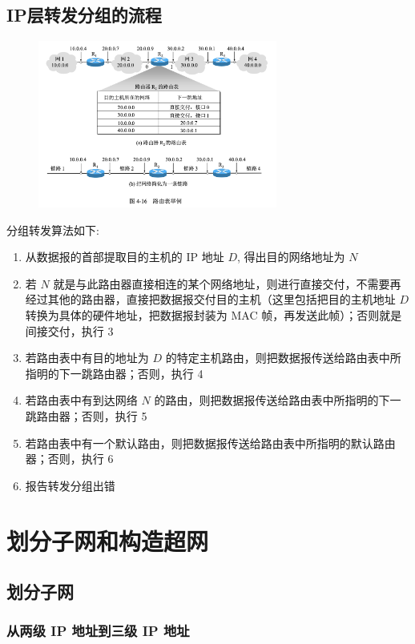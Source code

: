 \documentclass[cs4size,a4paper,10pt]{ctexart}
\begin{document}
	\subsection{IP层转发分组的流程}
	\begin{figure}[H]
		\centering
		\includegraphics[width=0.7\textwidth]{img/4.16}
	\end{figure}

	分组转发算法如下:
	\begin{enumerate}[label=\arabic*.]
		\item 从数据报的首部提取目的主机的 IP 地址 $D$, 得出目的网络地址为 $N$
		\item 若 $N$ 就是与此路由器直接相连的某个网络地址，则进行直接交付，不需要再经过其他的路由器，直接把数据报交付目的主机（这里包括把目的主机地址 $D$ 转换为具体的硬件地址，把数据报封装为 MAC 帧，再发送此帧）；否则就是间接交付，执行 3
		\item 若路由表中有目的地址为 $D$ 的特定主机路由，则把数据报传送给路由表中所指明的下一跳路由器；否则，执行 4
		\item 若路由表中有到达网络 $N$ 的路由，则把数据报传送给路由表中所指明的下一跳路由器；否则，执行 5
		\item 若路由表中有一个默认路由，则把数据报传送给路由表中所指明的默认路由器；否则，执行 6
		\item 报告转发分组出错
	\end{enumerate}

	\section{划分子网和构造超网}

	\subsection{划分子网}

	\subsubsection{从两级 IP 地址到三级 IP 地址}
\end{document}

